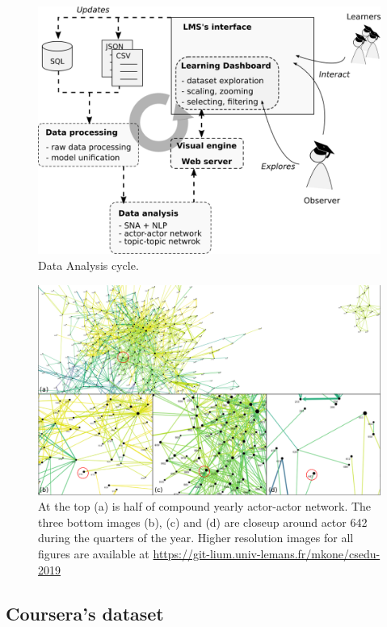 \documentclass[a4paper,twoside]{article}
\begin{document}
\begin{figure}[b]
 \includegraphics[width=.5\textwidth]{images/pipeline.png}
 \small{
  \caption{\label{fig:pipeline} Data Analysis cycle.
  }}
\end{figure}



\begin{figure}[t]
 \centering
 \includegraphics[width=\textwidth]{images/evolution.png}
 \small{
  \caption{\label{fig:evolution}
    At the top (a) is half of compound yearly actor-actor network.  The three bottom images (b), (c) and (d) are closeup around actor 642 during the quarters of the year. Higher resolution images for all figures are available at \url{https://git-lium.univ-lemans.fr/mkone/csedu-2019}
  }}
\end{figure}

\subsection{Coursera's dataset}
\end{document}
